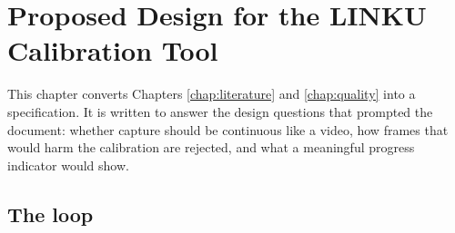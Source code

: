 \chapter{Proposed Design for the LINKU Calibration Tool}
\label{chap:design}

This chapter converts Chapters \ref{chap:literature} and \ref{chap:quality} into a specification. It is written to answer the design questions that prompted the document: whether capture should be continuous like a video, how frames that would harm the calibration are rejected, and what a meaningful progress indicator would show.

\section{The loop}

